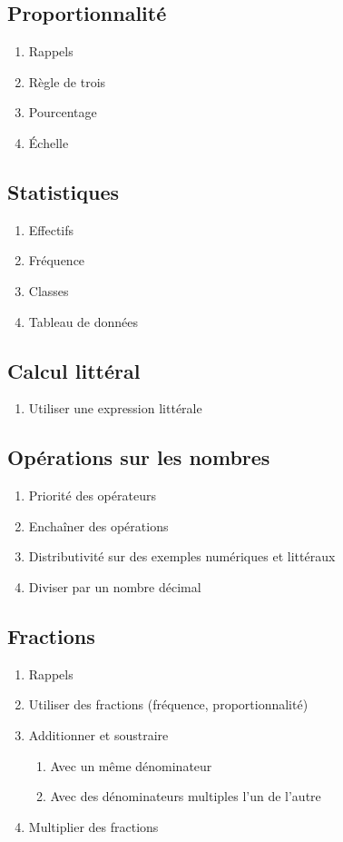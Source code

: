 \subsection{Proportionnalité}\label{ch_5_proba}
\begin{enumerate}
	\item Rappels
	\item Règle de trois
	\item Pourcentage
	\item \'Echelle
\end{enumerate}

\subsection{Statistiques}\label{ch_5_stats}
\begin{enumerate}
	\item Effectifs
	\item Fréquence
	\item Classes
	\item Tableau de données
\end{enumerate}

\subsection{Calcul littéral}\label{ch_5_lit}
\begin{enumerate}
	\item Utiliser une expression littérale
\end{enumerate}

\subsection{Opérations sur les nombres}\label{ch_5_op}

\begin{enumerate}
	\item Priorité des opérateurs
	\item Enchaîner des opérations
	\item Distributivité sur des exemples numériques et littéraux
	\item Diviser par un nombre décimal
\end{enumerate}

\subsection{Fractions}\label{ch_5_frac}
\begin{enumerate}
	\item Rappels
	\item Utiliser des fractions (fréquence, proportionnalité)
	\item Additionner et soustraire
		\begin{enumerate}
			\item Avec un même dénominateur
			\item Avec des dénominateurs multiples l'un de l'autre
		\end{enumerate}
	\item Multiplier des fractions
\end{enumerate}


